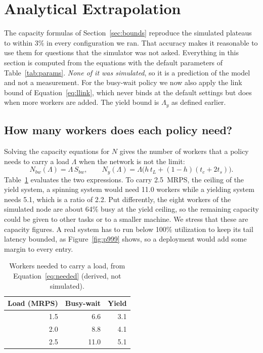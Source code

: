 \section{Analytical Extrapolation}
\label{sec:analysis}
The capacity formulas of Section~\ref{sec:bounds} reproduce the simulated plateaus to within 3\% in every configuration we ran. That accuracy makes it reasonable to use them for questions that the simulator was not asked. Everything in this section is computed from the equations with the default parameters of Table~\ref{tab:params}. \emph{None of it was simulated}, so it is a prediction of the model and not a measurement. For the busy-wait policy we now also apply the link bound of Equation~\eqref{eq:llink}, which never binds at the default settings but does when more workers are added. The yield bound is $\Lambda_y$ as defined earlier.

\subsection{How many workers does each policy need?}
Solving the capacity equations for $N$ gives the number of workers that a policy needs to carry a load $\Lambda$ when the network is not the limit:
\begin{equation}
N_{bw}(\Lambda)=\Lambda\,S_{bw},\qquad N_{y}(\Lambda)=\Lambda\bigl(h\,t_L+(1-h)(t_c+2t_s)\bigr).
\label{eq:needed}
\end{equation}
Table~\ref{tab:workers} evaluates the two expressions. To carry 2.5~MRPS, the ceiling of the yield system, a spinning system would need 11.0 workers while a yielding system needs 5.1, which is a ratio of 2.2. Put differently, the eight workers of the simulated node are about 64\% busy at the yield ceiling, so the remaining capacity could be given to other tasks or to a smaller machine. We stress that these are capacity figures. A real system has to run below 100\% utilization to keep its tail latency bounded, as Figure~\ref{fig:p999} shows, so a deployment would add some margin to every entry.

\begin{table}[t]
\caption{Workers needed to carry a load, from Equation~\eqref{eq:needed} (derived, not simulated).}
\label{tab:workers}
\centering
\footnotesize
\begin{tabular}{rrr}
\toprule
Load (MRPS) & Busy-wait & Yield \\
\midrule
1.5 & 6.6 & 3.1 \\
2.0 & 8.8 & 4.1 \\
2.5 & 11.0 & 5.1 \\
\bottomrule
\end{tabular}
\end{table}

